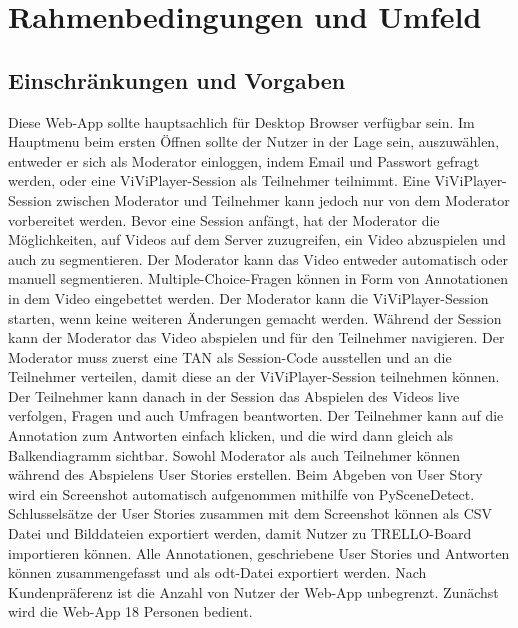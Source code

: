 \section{Rahmenbedingungen und Umfeld}

\subsection{Einschränkungen und Vorgaben}
Diese Web-App sollte hauptsachlich für Desktop Browser verfügbar sein. Im Hauptmenu beim ersten Öffnen sollte der Nutzer in der Lage sein, auszuwählen, entweder er sich als Moderator einloggen, indem Email und Passwort gefragt werden, oder eine ViViPlayer-Session als Teilnehmer teilnimmt. Eine ViViPlayer-Session zwischen Moderator und Teilnehmer kann jedoch nur von dem Moderator vorbereitet werden.\linebreak
\linebreak
Bevor eine Session anfängt, hat der Moderator die Möglichkeiten, auf Videos auf dem Server zuzugreifen, ein Video abzuspielen und auch zu segmentieren. Der Moderator kann 
das Video entweder automatisch oder manuell segmentieren. Multiple-Choice-Fragen können in Form von Annotationen in dem Video eingebettet werden. Der Moderator kann die ViViPlayer-Session starten, wenn keine weiteren Änderungen gemacht werden.\linebreak
\linebreak
Während der Session kann der Moderator das Video abspielen und für den Teilnehmer navigieren. Der Moderator muss zuerst eine TAN als Session-Code ausstellen und an die Teilnehmer verteilen, damit diese an der ViViPlayer-Session teilnehmen können. Der Teilnehmer kann danach in der Session das Abspielen des Videos live verfolgen, Fragen und auch Umfragen beantworten. Der Teilnehmer kann auf die Annotation zum Antworten einfach klicken, und die wird dann gleich als Balkendiagramm sichtbar. 
Sowohl Moderator als auch Teilnehmer können während des Abspielens User Stories erstellen. Beim Abgeben von User Story wird ein Screenshot automatisch aufgenommen mithilfe von PySceneDetect. Schlusselsätze der User Stories zusammen mit dem Screenshot können als CSV Datei und Bilddateien exportiert werden, damit Nutzer zu TRELLO-Board importieren können. 
Alle Annotationen, geschriebene User Stories und Antworten können zusammengefasst und als odt-Datei exportiert werden.\linebreak
\linebreak
Nach Kundenpräferenz ist die Anzahl von Nutzer der Web-App unbegrenzt. Zunächst wird die Web-App 18 Personen bedient.

